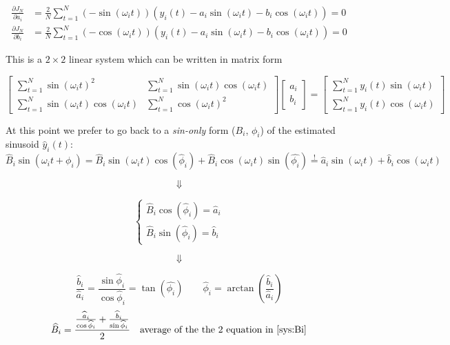 
\begin{align*}
    \frac{\partial J_N}{\partial a_i} &= \frac{2}{N} \sum_{t=1}^N (-\sin(\omega_it))(y_i(t) - a_i\sin(\omega_it)-b_i\cos(\omega_it)) = 0 \\
    \frac{\partial J_N}{\partial b_i} &= \frac{2}{N} \sum_{t=1}^N (-\cos(\omega_it))(y_i(t) - a_i\sin(\omega_it)-b_i\cos(\omega_it)) = 0
\end{align*}

This is a $2 \times 2$ linear system which can be written in matrix form

\[
    \begin{bmatrix}
        \sum_{t=1}^N \sin(\omega_it)^2 & \sum_{t=1}^N \sin(\omega_it)\cos(\omega_it) \\
        \sum_{t=1}^N \sin(\omega_it)\cos(\omega_it) & \sum_{t=1}^N \cos(\omega_it)^2
    \end{bmatrix}
    \begin{bmatrix}
        a_i \\ b_i
    \end{bmatrix} =
    \begin{bmatrix}
        \sum_{t=1}^N y_i(t)\sin(\omega_it) \\
        \sum_{t=1}^N y_i(t)\cos(\omega_it)
    \end{bmatrix}
\]

At this point we prefer to go back to a \emph{sin-only} form ($B_i$, $\phi_i$) of the estimated sinusoid $\hat{y}_i(t)$:
\[
    \hat{B}_i\sin(\omega_it + \phi_i) = \hat{B}_i\sin(\omega_it)\cos(\hat{\phi}_i) + \hat{B}_i\cos(\omega_it)\sin(\hat{\phi_i}) \stackrel{\text{!}}{=} \hat{a}_i\sin(\omega_it) + \hat{b}_i\cos(\omega_it)
\]

\[\Downarrow\]

\[
    \begin{cases}\label{sys:Bi}\tag{$\bigstar$}
         \hat{B}_i\cos(\hat{\phi}_i) = \hat{a}_i  \\
         \hat{B}_i\sin(\hat{\phi}_i) = \hat{b}_i 
    \end{cases}
\]

\[\Downarrow\]

\[
    \frac{\hat{b}_i}{\hat{a}_i} = \frac{\sin\hat{\phi}_i}{\cos{\hat{\phi}_i}} = \tan(\hat{\phi_i}) \qquad \hat{\phi}_i = \arctan \left( \frac{\hat{b}_i}{\hat{a}_i} \right)
\]
\[
    \hat{B}_i = \frac{\frac{\hat{a}_i}{\cos\hat{\phi}_i} + \frac{\hat{b}_i}{\sin\hat{\phi}_i}}{2} \quad \text{average of the the 2 equation in \eqref{sys:Bi}}
\]


